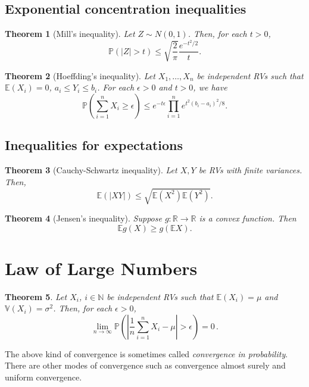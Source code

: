 \documentclass[
  openany]{book}
\newtheorem{theorem}{Theorem}[chapter]
\theoremstyle{definition}
\theoremstyle{definition}
\theoremstyle{definition}
\theoremstyle{definition}
\theoremstyle{remark}
\begin{document}
\subsection{Exponential concentration inequalities}\label{exponential-concentration-inequalities}

\begin{theorem}[Mill's inequality]
Let \(Z \sim N(0,1)\). Then,
for each \(t >0\),
\[ \mathbb{P}(|Z| > t) \leq \sqrt{\frac{2}{\pi}} \frac{e^{-t^2/2}}{t}. \]
\end{theorem}

\begin{theorem}[Hoeffding's inequality]
Let \(X_1, \dots, X_n\) be independent RVs such that
\(\mathbb{E}( X_i ) = 0\), \(a_i \leq Y_i \leq b_i\).
For each \(\epsilon >0\) and \(t>0\), we have
\[ \mathbb{P}\left(  \sum_{i=1}^n X_i \geq \epsilon \right) 
\leq e^{-t\epsilon} \prod_{i=1}^n e^{t^2(b_i - a_i)^2/8}. \]
\end{theorem}

\subsection{Inequalities for expectations}\label{inequalities-for-expectations}

\begin{theorem}[Cauchy-Schwartz inequality]
Let \(X, Y\) be RVs with finite variances. Then,
\[\mathbb{E}( |XY| ) \leq \sqrt{ \mathbb{E}(X^2) \mathbb{E}(Y^2) }.\]
\end{theorem}

\begin{theorem}[Jensen's inequality]
Suppose \(g:\mathbb{R}\to \mathbb{R}\) is a convex function.
Then
\[ \mathbb{E}g(X) \geq g(\mathbb{E}X). \]
\end{theorem}

\section{Law of Large Numbers}\label{law-of-large-numbers}

\begin{theorem}
Let \(X_i\), \(i\in \mathbb{N}\) be independent RVs such that \(\mathbb{E}(X_i) = \mu\)
and \(\mathbb{V}(X_i) = \sigma^2\).
Then, for each \(\epsilon > 0\),
\[ \lim_{n\to \infty} \mathbb{P}\left( \left| \frac{1}{n} \sum_{i=1}^n X_i - \mu  \right| > \epsilon   \right) = 0 \,.\]
\end{theorem}

The above kind of convergence is sometimes called \emph{convergence in probability}.
There are other modes of convergence such as convergence almost surely and
uniform convergence.
\end{document}
